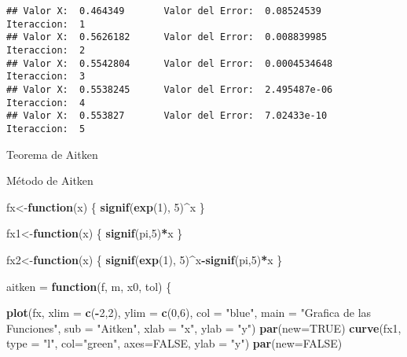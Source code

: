 \documentclass[]{article}
\newenvironment{Shaded}{\begin{snugshade}}{\end{snugshade}}
\newcommand{\ControlFlowTok}[1]{\textcolor[rgb]{0.13,0.29,0.53}{\textbf{#1}}}
\newcommand{\DataTypeTok}[1]{\textcolor[rgb]{0.13,0.29,0.53}{#1}}
\newcommand{\DecValTok}[1]{\textcolor[rgb]{0.00,0.00,0.81}{#1}}
\newcommand{\KeywordTok}[1]{\textcolor[rgb]{0.13,0.29,0.53}{\textbf{#1}}}
\newcommand{\NormalTok}[1]{#1}
\newcommand{\OperatorTok}[1]{\textcolor[rgb]{0.81,0.36,0.00}{\textbf{#1}}}
\newcommand{\OtherTok}[1]{\textcolor[rgb]{0.56,0.35,0.01}{#1}}
\newcommand{\StringTok}[1]{\textcolor[rgb]{0.31,0.60,0.02}{#1}}
\begin{document}
\begin{verbatim}
## Valor X:  0.464349       Valor del Error:  0.08524539        Iteraccion:  1 
## Valor X:  0.5626182      Valor del Error:  0.008839985       Iteraccion:  2 
## Valor X:  0.5542804      Valor del Error:  0.0004534648      Iteraccion:  3 
## Valor X:  0.5538245      Valor del Error:  2.495487e-06      Iteraccion:  4 
## Valor X:  0.553827       Valor del Error:  7.02433e-10       Iteraccion:  5
\end{verbatim}

Teorema de Aitken

Método de Aitken

\begin{Shaded}
\begin{Highlighting}[]
\NormalTok{fx<-}\ControlFlowTok{function}\NormalTok{(x)}
\NormalTok{\{}
  \KeywordTok{signif}\NormalTok{(}\KeywordTok{exp}\NormalTok{(}\DecValTok{1}\NormalTok{), }\DecValTok{5}\NormalTok{)}\OperatorTok{^}\NormalTok{x}
\NormalTok{\}}

\NormalTok{fx1<-}\ControlFlowTok{function}\NormalTok{(x)}
\NormalTok{\{}
  \KeywordTok{signif}\NormalTok{(pi,}\DecValTok{5}\NormalTok{)}\OperatorTok{*}\NormalTok{x}
\NormalTok{\}}

\NormalTok{fx2<-}\ControlFlowTok{function}\NormalTok{(x)}
\NormalTok{\{}
  \KeywordTok{signif}\NormalTok{(}\KeywordTok{exp}\NormalTok{(}\DecValTok{1}\NormalTok{), }\DecValTok{5}\NormalTok{)}\OperatorTok{^}\NormalTok{x}\OperatorTok{-}\KeywordTok{signif}\NormalTok{(pi,}\DecValTok{5}\NormalTok{)}\OperatorTok{*}\NormalTok{x}
\NormalTok{\}}

\NormalTok{aitken =}\StringTok{ }\ControlFlowTok{function}\NormalTok{(f, m, x0, tol)}
\NormalTok{\{}
  
  \KeywordTok{plot}\NormalTok{(fx, }\DataTypeTok{xlim =} \KeywordTok{c}\NormalTok{(}\OperatorTok{-}\DecValTok{2}\NormalTok{,}\DecValTok{2}\NormalTok{), }\DataTypeTok{ylim =} \KeywordTok{c}\NormalTok{(}\DecValTok{0}\NormalTok{,}\DecValTok{6}\NormalTok{), }\DataTypeTok{col =} \StringTok{"blue"}\NormalTok{, }\DataTypeTok{main =} \StringTok{"Grafica de las Funciones"}\NormalTok{, }\DataTypeTok{sub =} \StringTok{"Aitken"}\NormalTok{, }\DataTypeTok{xlab =} \StringTok{"x"}\NormalTok{, }\DataTypeTok{ylab =} \StringTok{"y"}\NormalTok{)}
  \KeywordTok{par}\NormalTok{(}\DataTypeTok{new=}\OtherTok{TRUE}\NormalTok{)}
  \KeywordTok{curve}\NormalTok{(fx1, }\DataTypeTok{type =} \StringTok{"l"}\NormalTok{, }\DataTypeTok{col=}\StringTok{"green"}\NormalTok{, }\DataTypeTok{axes=}\OtherTok{FALSE}\NormalTok{, }\DataTypeTok{ylab =} \StringTok{"y"}\NormalTok{)}
  \KeywordTok{par}\NormalTok{(}\DataTypeTok{new=}\OtherTok{FALSE}\NormalTok{)}
  

\end{Highlighting}
\end{Shaded}
\end{document}
